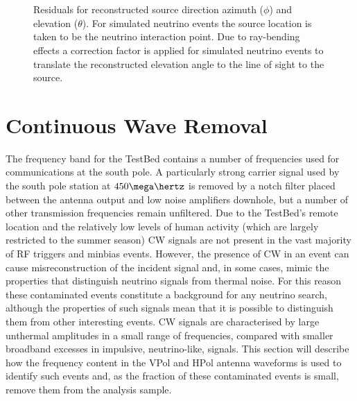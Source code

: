 \begin{figure}[htpb]
  \hfill
  \\
  \hfill
  \\
  \hfill
  \caption{Residuals for reconstructed source direction azimuth ($\phi$) and elevation ($\theta$). For simulated neutrino events the source location is taken to be the neutrino interaction point. Due to ray-bending effects a correction factor is applied for simulated neutrino events to translate the reconstructed elevation angle to the line of sight to the source.}
  \label{fig:analysis:Reconstructed:CSW-Residuals}
\end{figure}

\section{Continuous Wave Removal}
\label{sec:Analysis:CWRemoval}

The frequency band for the TestBed contains a number of frequencies used for communications at the south pole. A particularly strong carrier signal used by the south pole station at $450 \mega \hertz$ is removed by a notch filter placed between the antenna output and low noise amplifiers downhole, but a number of other transmission frequencies remain unfiltered. Due to the TestBed's remote location and the relatively low levels of human activity (which are largely restricted to the summer season) CW signals are not present in the vast majority of RF triggers and minbias events. However, the presence of CW in an event can cause misreconstruction of the incident signal and, in some cases, mimic the properties that distinguish neutrino signals from thermal noise. For this reason these contaminated events constitute a background for any neutrino search, although the properties of such signals mean that it is possible to distinguish them from other interesting events. CW signals are characterised by large unthermal amplitudes in a small range of frequencies, compared with smaller broadband excesses in impulsive, neutrino-like, signals. This section will describe how the frequency content in the VPol and HPol antenna waveforms is used to identify such events and, as the fraction of these contaminated events is small, remove them from the analysis sample.

